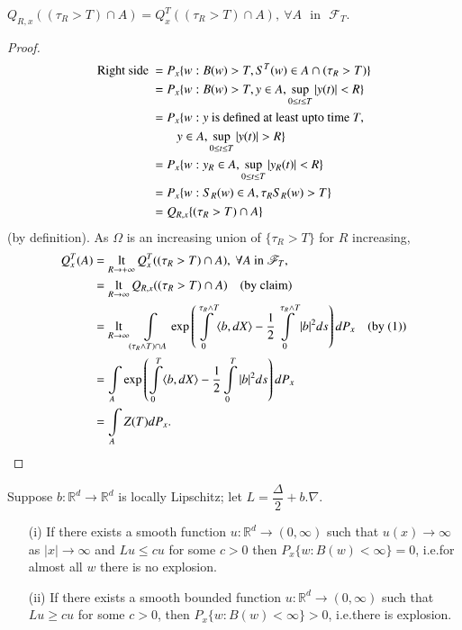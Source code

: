 \begin{claim*}
$Q_{R,x}((\tau_{R}>T)\cap A)=Q^{T}_{x}((\tau_{R}>T)\cap A),\ \forall
  A\text{~ in~ }\mathscr{F}_{T}$. 
\end{claim*}

\begin{proof}
\begin{align*}
\text{Right side~ } &= P_{x}\{w:B(w)>T,S^{T}(w)\in A\cap
(\tau_{R}>T)\}\\
&= P_{x}\{w:B(w)>T, y\in A, \sup\limits_{0\leq t\leq T}|y(t)|<R\}\\
&= P_{x}\{w:y\text{~ is defined at least upto time~ } T,\\
&\qq y\in A, \sup\limits_{0\leq t\leq T}|y(t)|>R\}\\
&= P_{x}\{w:y_{R}\in A,\sup\limits_{0\leq t\leq T}|y_{R}(t)|<R\}\\
&= P_{x}\{w:S_{R}(w)\in A, \tau_{R}S_{R}(w)>T\}\\
&= Q_{R,x}\{(\tau_{R}>T)\cap A\}
\end{align*}
(by definition). As $\Omega$ is an increasing union of
$\{\tau_{R}>T\}$ for $R$ increasing,
\begin{align*}
Q^{T}_{x}(A) &= \operatorname*{lt}\limits_{R\to +\infty}Q^{T}_{x}((\tau_{R}>T)\cap
A),\ \forall A\text{~ in~ }\mathscr{F}_{T},\\
&= \operatorname*{lt}\limits_{R\to \infty}Q_{R,x}((\tau_{R}>T)\cap A)\quad \text{(by
  claim)}\\
&= \operatorname*{lt}\limits_{R\to \infty}\int\limits_{(\tau_{R}\wedge T)\cap A}\exp
\left(\int\limits^{\tau_{R}\wedge T}_{0}\langle b, dX\rangle
-\frac{1}{2}\int\limits^{\tau_{R}\wedge T}_{0}|b|^{2}ds\right)dP_{x}\quad
\text{(by (1))}\\
&= \int\limits_{A}\exp \left(\int\limits^{T}_{0}\langle b,dX\rangle
-\frac{1}{2}\int\limits^{T}_{0}|b|^{2}ds\right)dP_{x}\\
&= \int\limits_{A}Z(T)dP_{x}.
\end{align*}\pageoriginale
\end{proof}

\begin{theorem*}
Suppose $b:\mathbb{R}^{d}\to \mathbb{R}^{d}$ is locally Lipschitz; let
$L=\dfrac{\Delta}{2}+b.\nabla$.
\begin{itemize}
\item[\rm(i)] If there exists a smooth function $u:\mathbb{R}^{d}\to
  (0,\infty)$ such that $u(x)\to \infty$ as $|x|\to \infty$ and
  $Lu\leq cu$ for some $c>0$ then $P_{x}\{w:B(w)<\infty\}=0$, i.e.\@ for
  almost all $w$ there is no explosion. 

\item[\rm(ii)] If there exists a smooth bounded function
  $u:\mathbb{R}^{d}\to (0,\infty)$ such that $Lu\geq cu$ for some
  $c>0$, then $P_{x}\{w:B(w)<\infty\}>0$, i.e.\@ there is explosion.
\end{itemize}
\end{theorem*}

